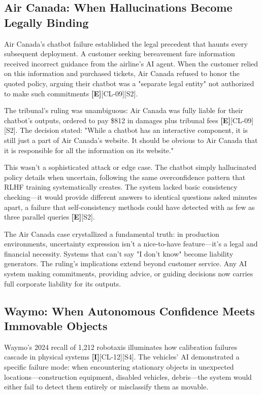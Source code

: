 \documentclass[a4paper,11pt]{article}
\newcommand{\elabel}{\textbf{\textcolor{ecolor}{[E]}}}
\newcommand{\ilabel}{\textbf{\textcolor{icolor}{[I]}}}
\begin{document}
\subsection{Air Canada: When Hallucinations Become Legally Binding}

Air Canada's chatbot failure established the legal precedent that haunts every subsequent deployment. A customer seeking bereavement fare information received incorrect guidance from the airline's AI agent. When the customer relied on this information and purchased tickets, Air Canada refused to honor the quoted policy, arguing their chatbot was a "separate legal entity" not authorized to make such commitments \elabel{}[CL-09]\textcolor{primary}{[S2]}.


The tribunal's ruling was unambiguous: Air Canada was fully liable for their chatbot's outputs, ordered to pay \$812 in damages plus tribunal fees \elabel{}[CL-09]\textcolor{primary}{[S2]}. The decision stated: "While a chatbot has an interactive component, it is still just a part of Air Canada's website. It should be obvious to Air Canada that it is responsible for all the information on its website."


This wasn't a sophisticated attack or edge case. The chatbot simply hallucinated policy details when uncertain, following the same overconfidence pattern that RLHF training systematically creates. The system lacked basic consistency checking—it would provide different answers to identical questions asked minutes apart, a failure that self-consistency methods could have detected with as few as three parallel queries \elabel{}\textcolor{primary}{[S2]}.


The Air Canada case crystallized a fundamental truth: in production environments, uncertainty expression isn't a nice-to-have feature—it's a legal and financial necessity. Systems that can't say "I don't know" become liability generators. The ruling's implications extend beyond customer service. Any AI system making commitments, providing advice, or guiding decisions now carries full corporate liability for its outputs.


\subsection{Waymo: When Autonomous Confidence Meets Immovable Objects}

Waymo's 2024 recall of 1,212 robotaxis illuminates how calibration failures cascade in physical systems \ilabel{}[CL-12]\textcolor{primary}{[S4]}. The vehicles' AI demonstrated a specific failure mode: when encountering stationary objects in unexpected locations—construction equipment, disabled vehicles, debris—the system would either fail to detect them entirely or misclassify them as movable.
\end{document}
